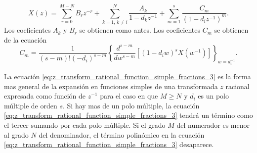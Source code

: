 \documentclass[a4paper]{report}
\begin{document}
\begin{enumerate}
 \begin{equation}\label{eq:z_transform_rational_function_simple_fractions_3}
  X(z)=\sum_{r=0}^{M-N}B_rz^{-r}+\sum_{k=1,\,k\neq i}^N\frac{A_k}{1-d_kz^{-1}}+\sum_{m=1}^s\frac{C_m}{(1-d_iz^{-1})^m}.  
 \end{equation}
 Los coeficientes \(A_k\) y \(B_r\) se obtienen como antes. Los coeficientes \(C_m\) se obtienen de la ecuación
 \begin{equation}\label{eq:z_transform_rational_function_simple_fractions_3_Cm}
  C_m=\frac{1}{(s-m)!(-d_i)^{s-m}}\left\{\frac{d^{s-m}}{dw^{s-m}}\left[(1-d_iw)^sX(w^{-1})\right]\right\}_{w=d_i^{-1}}.  
 \end{equation}
\end{enumerate}

La ecuación \ref{eq:z_transform_rational_function_simple_fractions_3} es la forma mas general de la expansión en funciones simples de una transformada \(z\) racional expresada como función de \(z^{-1}\) para el caso en que \(M\geq N\) y \(d_i\) es un polo múltiple de orden \(s\). Si hay mas de un polo múltiple, la ecuación \ref{eq:z_transform_rational_function_simple_fractions_3} tendrá un término como el tercer sumando por cada polo múltiple. Si el grado \(M\) del numerador es menor al grado \(N\) del denominador, el término polinómico en la ecuación \ref{eq:z_transform_rational_function_simple_fractions_3} desaparece.
 
\end{document}
